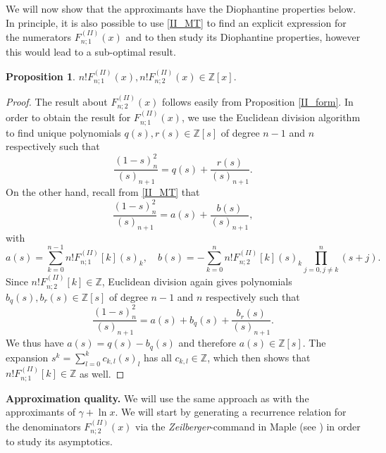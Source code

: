 \documentclass[a4paper,12pt,oneside]{article}
\theoremstyle{definition}
\newtheorem{prop}[defi]{Proposition}
\newcommand{\Z}{\mathbb{Z}}
\begin{document}
We will now show that the approximants have the Diophantine properties below. In principle, it is also possible to use \eqref{II_MT} to find an explicit expression for the numerators $F_{n;1}^{(II)}(x)$ and to then study its Diophantine properties, however this would lead to a sub-optimal result.

\begin{prop}
    $ n! F_{n;1}^{(II)}(x), n! F_{n;2}^{(II)}(x) \in\Z[x]. $
\end{prop}
\begin{proof}
    The result about $F_{n;2}^{(II)}(x)$ follows easily from Proposition \ref{II_form}. In order to obtain the result for $F_{n;1}^{(II)}(x)$, we use the Euclidean division algorithm to find unique polynomials $q(s),r(s)\in \Z[s]$ of degree $n-1$ and $n$ respectively such that
        $$\frac{(1-s)_n^2}{(s)_{n+1}} = q(s) + \frac{r(s)}{(s)_{n+1}}. $$
    On the other hand, recall from \eqref{II_MT} that
    $$\frac{(1-s)_n^2}{(s)_{n+1}} = a(s) + \frac{b(s)}{(s)_{n+1}}, $$
    with 
    $$a(s) = \sum_{k=0}^{n-1} n! F_{n;1}^{(II)}[k] (s)_k,\quad b(s) = - \sum_{k=0}^{n} n! F_{n;2}^{(II)}[k] (s)_k \prod_{j=0,j\neq k}^{n} (s+j). $$
    Since $n! F_{n;2}^{(II)}[k]\in\Z$, Euclidean division again gives polynomials $b_q(s),b_r(s)\in \Z[s]$ of degree $n-1$ and $n$ respectively such that
    $$\frac{(1-s)_n^2}{(s)_{n+1}} = a(s) + b_q(s) + \frac{b_r(s)}{(s)_{n+1}}.$$
    We thus have $a(s) = q(s) - b_q(s)$ and therefore $a(s)\in\Z[s]$. The expansion $s^k=\sum_{l=0}^k c_{k,l} (s)_l$ has all $c_{k,l}\in\Z$, which then shows that $n! F_{n;1}^{(II)}[k]\in\Z$ as well.
\end{proof}  

\bigbreak


\textbf{Approximation quality.} We will use the same approach as with the approximants of $\gamma+\ln x$. We will start by generating a recurrence relation for the denominators $F_{n;2}^{(II)}(x)$ via the \textit{Zeilberger}-command in Maple (see \cite{A=B}) in order to study its asymptotics.
\end{document}

